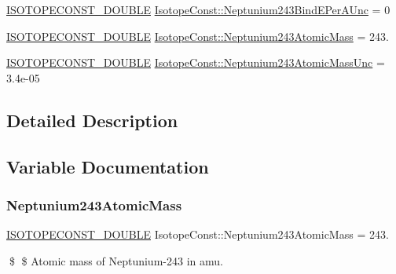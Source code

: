 \begin{DoxyCompactItemize}
\mbox{\hyperlink{group___isotope_const-_macros_ga8f45a7272ce02c0b4c65c44636ed719a}{I\+S\+O\+T\+O\+P\+E\+C\+O\+N\+S\+T\+\_\+\+D\+O\+U\+B\+LE}} \mbox{\hyperlink{group___isotope_const-_neptunium-_np243_ga437f314577a5cec5a334f549268600c4}{Isotope\+Const\+::\+Neptunium243\+Bind\+E\+Per\+A\+Unc}} = 0
\item 
\mbox{\hyperlink{group___isotope_const-_macros_ga8f45a7272ce02c0b4c65c44636ed719a}{I\+S\+O\+T\+O\+P\+E\+C\+O\+N\+S\+T\+\_\+\+D\+O\+U\+B\+LE}} \mbox{\hyperlink{group___isotope_const-_neptunium-_np243_ga26a390f1b18c59526d8770fb93c052f3}{Isotope\+Const\+::\+Neptunium243\+Atomic\+Mass}} = 243.
\item 
\mbox{\hyperlink{group___isotope_const-_macros_ga8f45a7272ce02c0b4c65c44636ed719a}{I\+S\+O\+T\+O\+P\+E\+C\+O\+N\+S\+T\+\_\+\+D\+O\+U\+B\+LE}} \mbox{\hyperlink{group___isotope_const-_neptunium-_np243_ga30cf612d85fa38c4dacfa364b42853de}{Isotope\+Const\+::\+Neptunium243\+Atomic\+Mass\+Unc}} = 3.\+4e-\/05
\end{DoxyCompactItemize}


\subsection{Detailed Description}


\subsection{Variable Documentation}
\mbox{\label{group___isotope_const-_neptunium-_np243_ga26a390f1b18c59526d8770fb93c052f3}} 
\subsubsection{\texorpdfstring{Neptunium243\+Atomic\+Mass}{Neptunium243AtomicMass}}
{\footnotesize\ttfamily \mbox{\hyperlink{group___isotope_const-_macros_ga8f45a7272ce02c0b4c65c44636ed719a}{I\+S\+O\+T\+O\+P\+E\+C\+O\+N\+S\+T\+\_\+\+D\+O\+U\+B\+LE}} Isotope\+Const\+::\+Neptunium243\+Atomic\+Mass = 243.}

\$ \$ Atomic mass of Neptunium-\/243 in amu. \mbox{\label{group___isotope_const-_neptunium-_np243_ga30cf612d85fa38c4dacfa364b42853de}} 
